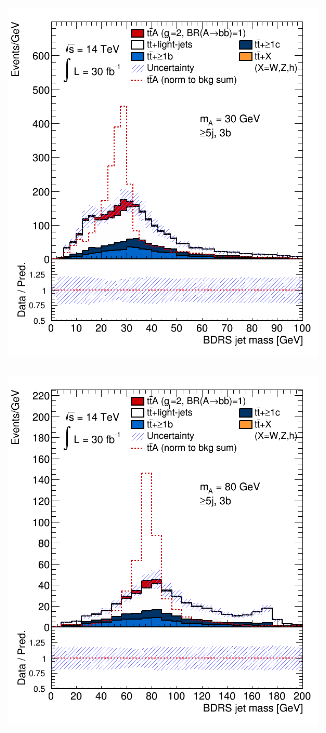 \begin{figure}[p!]
\begin{subfigure}{0.5\textwidth}
  \centering
  \includegraphics[width=0.9\textwidth]{figures/ttA/VD_1_30.png}
  \caption{}
  \label{}
\end{subfigure}
\begin{subfigure}{0.5\textwidth}
  \centering
  \includegraphics[width=0.9\textwidth]{figures/ttA/VD_1.png}

\end{subfigure}
\end{figure}
